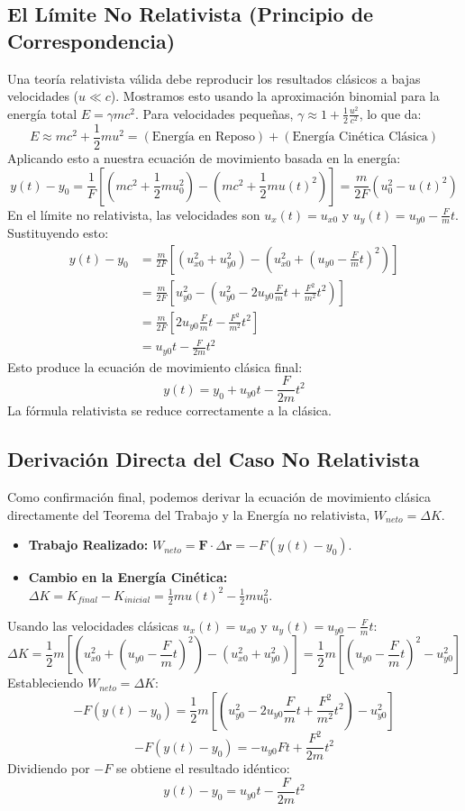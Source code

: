 \documentclass[11pt,a4paper]{article}
\begin{document}
\subsection{El Límite No Relativista (Principio de Correspondencia)}
Una teoría relativista válida debe reproducir los resultados clásicos a bajas velocidades ($u \ll c$). Mostramos esto usando la aproximación binomial para la energía total $E = \gamma mc^2$. Para velocidades pequeñas, $\gamma \approx 1 + \frac{1}{2}\frac{u^2}{c^2}$, lo que da:
\[ E \approx mc^2 + \frac{1}{2}mu^2 = (\text{Energía en Reposo}) + (\text{Energía Cinética Clásica}) \]
Aplicando esto a nuestra ecuación de movimiento basada en la energía:
\[ y(t) - y_0 = \frac{1}{F} \left[ \left(mc^2 + \frac{1}{2}mu_0^2\right) - \left(mc^2 + \frac{1}{2}mu(t)^2\right) \right] = \frac{m}{2F}(u_0^2 - u(t)^2) \]
En el límite no relativista, las velocidades son $u_x(t) = u_{x0}$ y $u_y(t) = u_{y0} - \frac{F}{m}t$. Sustituyendo esto:
\begin{align*}
y(t) - y_0 &= \frac{m}{2F} \left[ (u_{x0}^2 + u_{y0}^2) - \left(u_{x0}^2 + (u_{y0} - \frac{F}{m}t)^2\right) \right] \\
&= \frac{m}{2F} \left[ u_{y0}^2 - \left(u_{y0}^2 - 2u_{y0}\frac{F}{m}t + \frac{F^2}{m^2}t^2\right) \right] \\
&= \frac{m}{2F} \left[ 2u_{y0}\frac{F}{m}t - \frac{F^2}{m^2}t^2 \right] \\
&= u_{y0}t - \frac{F}{2m}t^2
\end{align*}
Esto produce la ecuación de movimiento clásica final:
\[ \boxed{y(t) = y_0 + u_{y0}t - \frac{F}{2m}t^2} \]
La fórmula relativista se reduce correctamente a la clásica.

\subsection{Derivación Directa del Caso No Relativista}
Como confirmación final, podemos derivar la ecuación de movimiento clásica directamente del Teorema del Trabajo y la Energía no relativista, $W_{neto} = \Delta K$.
\begin{itemize}
    \item \textbf{Trabajo Realizado:} $W_{neto} = \boldsymbol{F} \cdot \Delta\boldsymbol{r} = -F(y(t) - y_0)$.
    \item \textbf{Cambio en la Energía Cinética:} $\Delta K = K_{final} - K_{inicial} = \frac{1}{2}mu(t)^2 - \frac{1}{2}mu_0^2$.
\end{itemize}
Usando las velocidades clásicas $u_x(t) = u_{x0}$ y $u_y(t) = u_{y0} - \frac{F}{m}t$:
\[ \Delta K = \frac{1}{2}m\left[ (u_{x0}^2 + (u_{y0}-\frac{F}{m}t)^2) - (u_{x0}^2+u_{y0}^2) \right] = \frac{1}{2}m\left[ (u_{y0}-\frac{F}{m}t)^2 - u_{y0}^2 \right] \]
Estableciendo $W_{neto} = \Delta K$:
\[ -F(y(t)-y_0) = \frac{1}{2}m\left[ (u_{y0}^2 - 2u_{y0}\frac{F}{m}t + \frac{F^2}{m^2}t^2) - u_{y0}^2 \right] \]
\[ -F(y(t)-y_0) = -u_{y0}Ft + \frac{F^2}{2m}t^2 \]
Dividiendo por $-F$ se obtiene el resultado idéntico:
\[ y(t) - y_0 = u_{y0}t - \frac{F}{2m}t^2 \]
\end{document}
